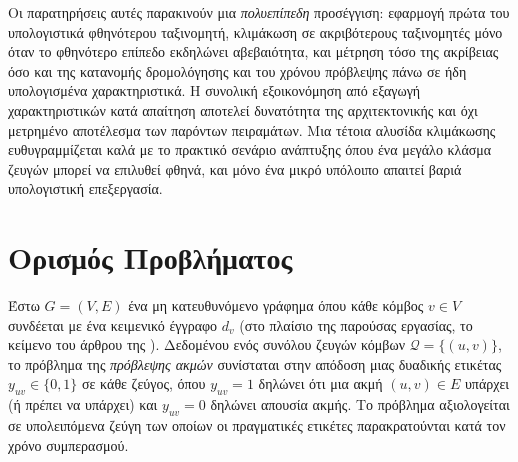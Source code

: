 Οι παρατηρήσεις αυτές παρακινούν μια \textit{πολυεπίπεδη} προσέγγιση: εφαρμογή
πρώτα του υπολογιστικά φθηνότερου ταξινομητή, κλιμάκωση σε ακριβότερους ταξινομητές
μόνο όταν το φθηνότερο επίπεδο εκδηλώνει αβεβαιότητα, και μέτρηση τόσο της ακρίβειας
όσο και της κατανομής δρομολόγησης και του χρόνου πρόβλεψης πάνω σε
ήδη υπολογισμένα χαρακτηριστικά.
Η συνολική εξοικονόμηση από εξαγωγή
χαρακτηριστικών κατά απαίτηση αποτελεί δυνατότητα της αρχιτεκτονικής και όχι
μετρημένο αποτέλεσμα των παρόντων πειραμάτων.
Μια τέτοια αλυσίδα κλιμάκωσης
ευθυγραμμίζεται καλά με το πρακτικό σενάριο ανάπτυξης όπου ένα μεγάλο κλάσμα ζευγών
μπορεί να επιλυθεί φθηνά, και μόνο ένα μικρό υπόλοιπο απαιτεί βαριά υπολογιστική
επεξεργασία.


\section{Ορισμός Προβλήματος}
\label{sec:problem-definition}

Έστω $G = (V, E)$ ένα μη κατευθυνόμενο γράφημα όπου κάθε κόμβος $v \in V$ συνδέεται
με ένα κειμενικό έγγραφο $d_v$ (στο πλαίσιο της παρούσας εργασίας, το κείμενο του
άρθρου της ). Δεδομένου ενός συνόλου ζευγών κόμβων $\mathcal{Q} =
\{(u, v)\}$, το πρόβλημα της \textit{πρόβλεψης ακμών} συνίσταται στην απόδοση μιας
δυαδικής ετικέτας $y_{uv} \in \{0, 1\}$ σε κάθε ζεύγος, όπου $y_{uv} = 1$ δηλώνει
ότι μια ακμή $(u, v) \in E$ υπάρχει (ή πρέπει να υπάρχει) και $y_{uv} = 0$ δηλώνει
απουσία ακμής.
Το πρόβλημα αξιολογείται σε υπολειπόμενα ζεύγη των οποίων οι
πραγματικές ετικέτες παρακρατούνται κατά τον χρόνο συμπερασμού.

